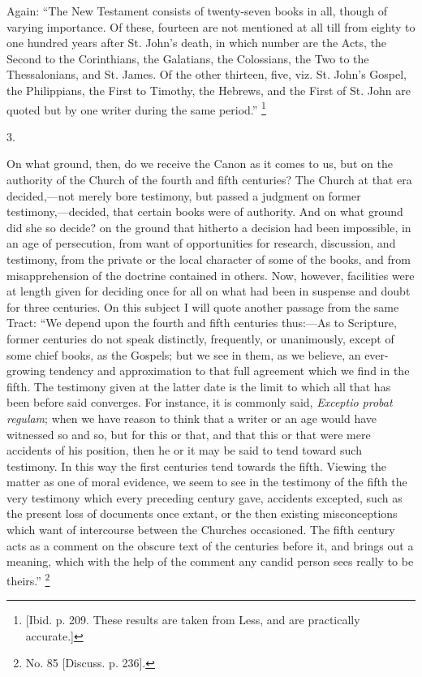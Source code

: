 Again: ``The New Testament consists of
twenty-seven books in all, though of varying importance.
Of these, fourteen are not mentioned at all till from
eighty to one hundred years after St. John's death, in
which number are the Acts, the Second to the Corinthians,
the Galatians, the Colossians, the Two to the
Thessalonians, and St. James. Of the other thirteen,
five, viz. St. John's Gospel, the Philippians, the First
to Timothy, the Hebrews, and the First of St. John are
quoted but by one writer during the same period.'' \footnote{[Ibid. p. 209. These results
are taken from Less, and are practically accurate.]}

3.

On what ground, then, do we receive the Canon as it
comes to us, but on the authority of the Church of the
fourth and fifth centuries? The Church at that era
decided,—not merely bore testimony, but passed a
judgment on former testimony,—decided, that certain
books were of authority. And on what ground did she so
decide? on the ground that hitherto a decision had been
impossible, in an age of persecution, from want of
opportunities for research, discussion, and testimony,
from the private or the local character of some of the
books, and from misapprehension of the doctrine contained
in others. Now, however, facilities were at length given
for deciding once for all on what had been in suspense
and doubt for three centuries. On this subject I will
quote another passage from the same Tract: ``We
depend upon the fourth and fifth centuries thus:—As
to Scripture, former centuries do not speak distinctly,
frequently, or unanimously, except of some chief books,
as the Gospels; but we see in them, as we believe, an
ever-growing tendency and approximation to that full
agreement which we find in the fifth. The testimony given
at the latter date is the limit to which all that has
been before said converges. For instance, it is commonly
said, \emph{Exceptio probat regulam}; when we have reason
to think that a writer or an age would have witnessed so
and so, but for this or that, and that this or that were
mere accidents of his position, then he or it may be said
to tend toward such testimony. In this way the first
centuries tend towards the fifth. Viewing the matter as
one of moral evidence, we seem to see in the testimony of
the fifth the very testimony which every preceding
century gave, accidents excepted, such as the present
loss of documents once extant, or the then existing
misconceptions which want of intercourse between the
Churches occasioned. The fifth century acts as a comment
on the obscure text of the centuries before it, and
brings out a meaning, which with the help of the comment
any candid person sees really to be theirs.'' \footnote{No. 85 [Discuss. p. 236].}

